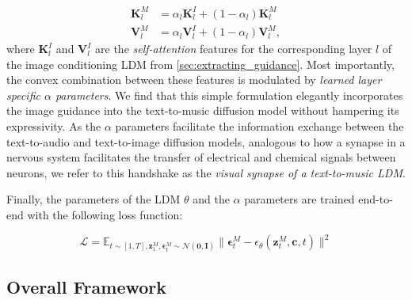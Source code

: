\vspace{-0.18in}

\begin{align} 
\bm{K}^M_l &=  \alpha_l \bm{K}^I_l + (1 - \alpha_l) \bm{K}^M_l \\ 
\bm{V}^M_l &=  \alpha_l \bm{V}^I_l + (1 - \alpha_l) \bm{V}^M_l\label{eqn:synapse},
\end{align}
where $\bm{K}^I_l$ and $\bm{V}^I_l$ are the \textit{self-attention} features for the corresponding layer $l$ of the image conditioning LDM from \cref{sec:extracting_guidance}. Most importantly, the convex combination between these features is modulated by \textit{learned layer specific $\alpha$ parameters}. We find that this simple formulation elegantly incorporates the image guidance into the text-to-music diffusion model without hampering its expressivity. As the $\alpha$ parameters facilitate the information exchange between the text-to-audio and text-to-image diffusion models, analogous to how a synapse in a nervous system facilitates the transfer of electrical and chemical signals between neurons, we refer to this handshake as the \textit{visual synapse of a text-to-music LDM}. 

Finally, the parameters of the LDM $\theta$ and the $\alpha$ parameters are trained end-to-end with the following loss function: 

\vspace{-0.17in}

\begin{equation}
    \mathcal{L} = \mathbb{E}_{t\sim[1,T], \bm{z}_1^M, \bm{\epsilon}^M_t \sim \mathcal{N}(\boldsymbol{0}, \textbf{I})}\lVert \bm{\epsilon}^M_t - \epsilon_\theta(\bm{z}_t^M, \bm{c}, t) \rVert^2
    \label{eqn:loss}
\end{equation} 

\subsection{Overall Framework}

